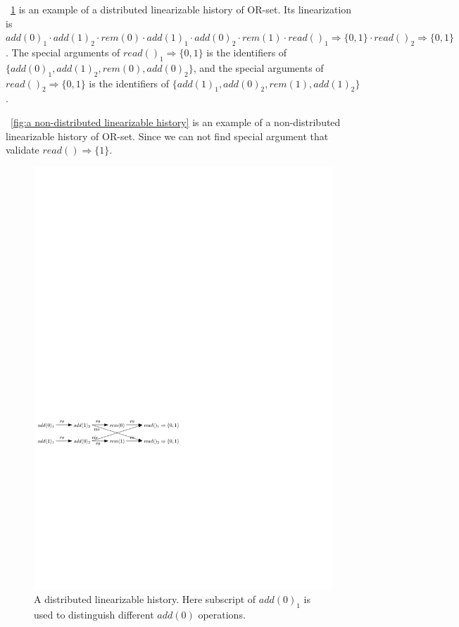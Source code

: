 \figurename~\ref{fig:a distributed linearizable history} is an example of a distributed linearizable history of OR-set. Its linearization is $\mathit{add}(0)_1 \cdot \mathit{add}(1)_2 \cdot \mathit{rem}(0) \cdot \mathit{add}(1)_1 \cdot \mathit{add}(0)_2 \cdot \mathit{rem}(1) \cdot \mathit{read}()_1 \Rightarrow \{0,1\} \cdot \mathit{read}()_2 \Rightarrow \{0,1\}$. The special arguments of $\mathit{read}()_1 \Rightarrow \{0,1\}$ is the identifiers of $\{ \mathit{add}(0)_1, \mathit{add}(1)_2, \mathit{rem}(0), \mathit{add}(0)_2 \}$, and the special arguments of $\mathit{read}()_2 \Rightarrow \{0,1\}$ is the identifiers of $\{ \mathit{add}(1)_1, \mathit{add}(0)_2, \mathit{rem}(1), \mathit{add}(1)_2 \}$.

\figurename~\ref{fig:a non-distributed linearizable history} is an example of a non-distributed linearizable history of OR-set. Since we can not find special argument that validate $\mathit{read}() \Rightarrow \{ 1 \}$.  
  
\begin{figure}[t]
  \centering
  \includegraphics[width=0.7 \textwidth]{figures/PIC-Example-LinHis.pdf}
  \caption{A distributed linearizable history. Here subscript of $\mathit{add}(0)_1$ is used to distinguish different $\mathit{add}(0)$ operations.}
  \label{fig:a distributed linearizable history}
\end{figure}



